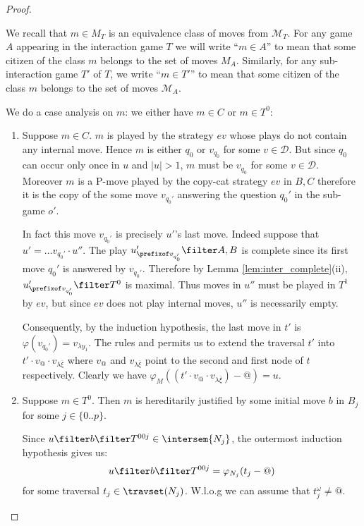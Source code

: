 \begin{proof}
\begin{enumerate}[$\bullet$]
\begin{enumerate}
We recall that $m \in M_T$ is an equivalence class of moves from $\mathcal{M}_T$. For any game $A$ appearing in the interaction game $T$ we will write ``$m \in A$'' to mean that some citizen of the class $m$ belongs to the set of moves $M_A$. Similarly, for any sub-interaction game $T'$ of $T$, we write ``$m \in T'$'' to mean that some citizen of the class $m$ belongs to the set of moves $\mathcal{M}_A$.

We do a case analysis on $m$: we either have $m\in C$ or $m\in T^0$:
    \begin{enumerate}[-]
    \item Suppose $m \in C$. $m$ is played by the strategy $ev$ whose plays do not contain any internal move. Hence $m$ is either $q_0$ or $v_{q_0}$ for some
    $v\in\mathcal{D}$. But since $q_0$ can occur only once in
    $u$ and $|u|>1$, $m$ must be $v_{q_0}$ for some
    $v\in \mathcal{D}$.  Moreover $m$ is a P-move played by the
    copy-cat strategy $ev$ in $B,C$ therefore it is the copy
    of the some move $v_{q_0'}$ answering the question $q_0'$ in the sub-game $o'$.

    In fact this move $v_{q_0'}$ is precisely $u'$'s last move. Indeed
    suppose that $u' = \ldots v_{q_0'} \cdot u''$. The play
    $u'_{\prefixof v_{q_0'}}\filter A,B$ is complete since its
    first move $q_0'$ is answered by $v_{q_0'}$. Therefore by
    Lemma \ref{lem:inter_complete}(ii), $u'_{\prefixof
    v_{q_0'}}\filter T^0$ is maximal. Thus moves in $u''$ must
    be played in $T^1$ by $ev$, but since $ev$ does not play internal
    moves, $u''$ is necessarily empty.

    Consequently, by the induction hypothesis, the last move in $t'$ is $\varphi(v_{q_0'}) = v_{\lambda y_1}$.
    The rules  and  permits us to extend
    the traversal $t'$ into $t' \cdot v_@ \cdot v_{\lambda \overline{\xi}}$ where $v_@$ and $v_{\lambda
    \overline{\xi}}$ point to the second and first node of $t$ respectively. Clearly we have $\varphi_M((t'\cdot v_@ \cdot v_{\lambda \overline{\xi}})-@) = u$.

    \item Suppose $m\in T^0$. Then $m$ is hereditarily justified by some initial move $b$ in $B_j$ for some $j\in \{0..p\}$.

        Since $u \filter b \filter T^{00j} \in \intersem{N_j}$, the outermost induction hypothesis gives us:
        \begin{equation}
        u \filter b \filter T^{00j} = \varphi_{N_j}(t_j-@)  \label{eqn:corresp_outmost_ih}
        \end{equation}
          for some traversal $t_j \in \travset(N_j)$. W.l.o.g we can assume that $t_j^\omega \neq @$.


\end{enumerate}
\end{enumerate}
\end{enumerate}
\end{proof}
